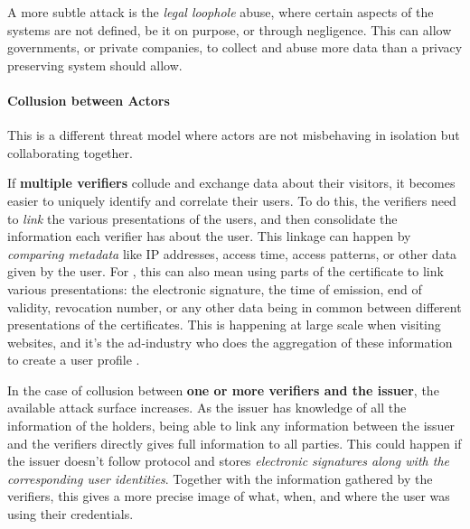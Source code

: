 
A more subtle attack is the \emph{legal loophole} abuse, where certain aspects of the systems
are not defined, be it on purpose, or through negligence.
This can allow governments, or private companies, to collect and abuse
more data than a privacy preserving system should allow.

\paragraph{Collusion between Actors}

This is a different threat model where actors are not misbehaving in isolation but collaborating together.

If \textbf{multiple verifiers} collude and exchange data about their visitors,
it becomes easier to uniquely identify and correlate their users.
To do this, the verifiers need to \emph{link} the various presentations of the users,
and then consolidate the information each verifier has about the user.
This linkage can happen by \emph{comparing metadata} like IP addresses, access
time, access patterns, or other data given by the user.
For \eid, this can also mean using parts of the certificate to link various presentations:
 the electronic signature, the time of emission, end of validity, revocation number,
or any other data being in common between different presentations of the certificates.
This is happening at large scale when visiting websites, and it's the ad-industry who
does the aggregation of these information to create a user profile \cite{BARW16}.

In the case of collusion between \textbf{one or more verifiers and the issuer},
the available attack surface increases.
As the issuer has knowledge of all the information of the holders, being able to
link any information between the issuer and the verifiers directly gives full
information to all parties.
This could happen if the issuer doesn't follow protocol and stores
\emph{electronic signatures along with the corresponding user identities}.
Together with the information gathered by the verifiers, this gives a more precise
image of what, when, and where the user was using their credentials.

